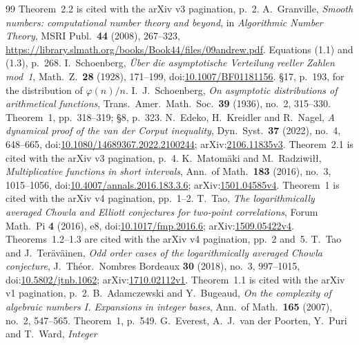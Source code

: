 \documentclass[11pt]{article}
\theoremstyle{plain}
\theoremstyle{definition}
\theoremstyle{remark}
\begin{document}
\begin{thebibliography}{99}
Theorem~2.2 is cited with the arXiv v3 pagination, p.~2.
A.~Granville, \emph{Smooth numbers: computational number theory and beyond},
in \emph{Algorithmic Number Theory}, MSRI Publ.\ \textbf{44} (2008), 267--323,
\url{https://library.slmath.org/books/Book44/files/09andrew.pdf}.
Equations (1.1) and (1.3), p.~268.
I.~Schoenberg, \emph{\"Uber die asymptotische Verteilung reeller Zahlen
mod~1}, Math.\ Z.\ \textbf{28} (1928), 171--199,
doi:\href{https://doi.org/10.1007/BF01181156}{10.1007/BF01181156}.
\S17, p.~193, for the distribution of $\varphi(n)/n$.
I.~J.~Schoenberg, \emph{On asymptotic distributions of arithmetical
functions}, Trans.\ Amer.\ Math.\ Soc.\ \textbf{39} (1936), no.~2, 315--330.
Theorem~1, pp.~318--319; \S8, p.~323.
N.~Edeko, H.~Kreidler and R.~Nagel, \emph{A dynamical proof of the van der
Corput inequality}, Dyn.\ Syst.\ \textbf{37} (2022), no.~4, 648--665,
doi:\href{https://doi.org/10.1080/14689367.2022.2100244}{10.1080/14689367.2022.2100244};
arXiv:\href{https://arxiv.org/abs/2106.11835v3}{2106.11835v3}.
Theorem~2.1 is cited with the arXiv v3 pagination, p.~4.
K.~Matom\"aki and M.~Radziwi\l\l, \emph{Multiplicative functions in short
intervals}, Ann.\ of Math.\ \textbf{183} (2016), no.~3, 1015--1056,
doi:\href{https://doi.org/10.4007/annals.2016.183.3.6}{10.4007/annals.2016.183.3.6};
arXiv:\href{https://arxiv.org/abs/1501.04585v4}{1501.04585v4}.
Theorem~1 is cited with the arXiv v4 pagination, pp.~1--2.
T.~Tao, \emph{The logarithmically averaged Chowla and Elliott conjectures for
two-point correlations}, Forum Math.\ Pi \textbf{4} (2016), e8,
doi:\href{https://doi.org/10.1017/fmp.2016.6}{10.1017/fmp.2016.6};
arXiv:\href{https://arxiv.org/abs/1509.05422v4}{1509.05422v4}.
Theorems~1.2--1.3 are cited with the arXiv v4 pagination, pp.~2 and~5.
T.~Tao and J.~Ter\"av\"ainen, \emph{Odd order cases of the logarithmically
averaged Chowla conjecture}, J.\ Th\'eor.\ Nombres Bordeaux \textbf{30}
(2018), no.~3, 997--1015,
doi:\href{https://doi.org/10.5802/jtnb.1062}{10.5802/jtnb.1062};
arXiv:\href{https://arxiv.org/abs/1710.02112v1}{1710.02112v1}.
Theorem~1.1 is cited with the arXiv v1 pagination, p.~2.
B.~Adamczewski and Y.~Bugeaud, \emph{On the complexity of algebraic numbers
I. Expansions in integer bases}, Ann.\ of Math.\ \textbf{165} (2007), no.~2,
547--565. Theorem~1, p.~549.
G.~Everest, A.~J.~van der Poorten, Y.~Puri and T.~Ward, \emph{Integer
}
\end{thebibliography}
\end{document}

